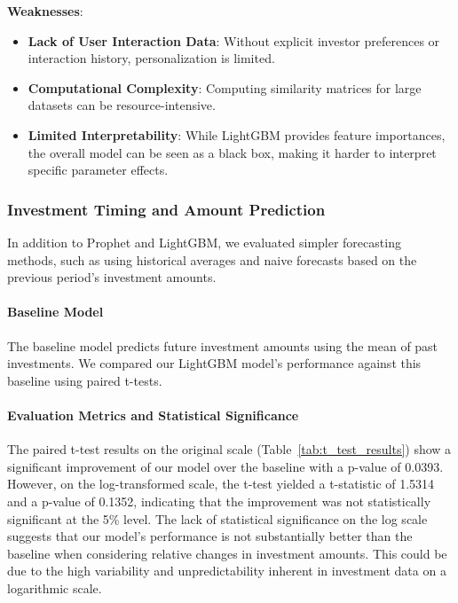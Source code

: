\documentclass[sigconf]{acmart}
\begin{document}
\textbf{Weaknesses}:

\begin{itemize}
    \item \textbf{Lack of User Interaction Data}: Without explicit investor preferences or interaction history, personalization is limited.
    \item \textbf{Computational Complexity}: Computing similarity matrices for large datasets can be resource-intensive.
    \item \textbf{Limited Interpretability}: While LightGBM provides feature importances, the overall model can be seen as a black box, making it harder to interpret specific parameter effects.
\end{itemize}

\subsubsection{Investment Timing and Amount Prediction}

In addition to Prophet and LightGBM, we evaluated simpler forecasting methods, such as using historical averages and naive forecasts based on the previous period's investment amounts.

\paragraph{Baseline Model}

The baseline model predicts future investment amounts using the mean of past investments. We compared our LightGBM model's performance against this baseline using paired t-tests.

\paragraph{Evaluation Metrics and Statistical Significance}

The paired t-test results on the original scale (Table~\ref{tab:t_test_results}) show a significant improvement of our model over the baseline with a p-value of 0.0393. However, on the log-transformed scale, the t-test yielded a t-statistic of 1.5314 and a p-value of 0.1352, indicating that the improvement was not statistically significant at the 5\% level. The lack of statistical significance on the log scale suggests that our model's performance is not substantially better than the baseline when considering relative changes in investment amounts. This could be due to the high variability and unpredictability inherent in investment data on a logarithmic scale.
\end{document}
